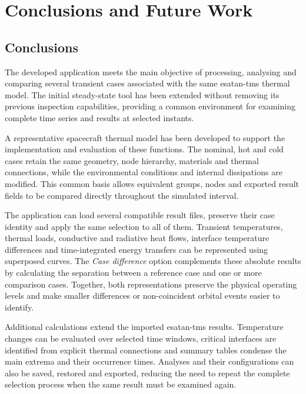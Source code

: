 \chapter{Conclusions and Future Work}
\label{ch:conclusions_future_work}

\section{Conclusions}
\label{sec:conclusions}

The developed application meets the main objective of processing, analysing
and comparing several transient cases associated with the same
\acrshort{esatan-tms} thermal model. The initial steady-state tool has been
extended without removing its previous inspection capabilities, providing a
common environment for examining complete time series and results at selected
instants.

A representative spacecraft thermal model has been developed to support the
implementation and evaluation of these functions. The nominal, hot and cold
cases retain the same geometry, node hierarchy, materials and thermal
connections, while the environmental conditions and internal dissipations are
modified. This common basis allows equivalent groups, nodes and exported
result fields to be compared directly throughout the simulated interval.

The application can load several compatible result files, preserve their case
identity and apply the same selection to all of them. Transient temperatures,
thermal loads, conductive and radiative heat flows, interface temperature
differences and time-integrated energy transfers can be represented using
superposed curves. The \textit{Case difference} option complements these
absolute results by calculating the separation between a reference case and
one or more comparison cases. Together, both representations preserve the
physical operating levels and make smaller differences or non-coincident
orbital events easier to identify.

Additional calculations extend the imported \acrshort{esatan-tms} results.
Temperature changes can be evaluated over selected time windows, critical
interfaces are identified from explicit thermal connections and summary tables
condense the main extrema and their occurrence times. Analyses and their
configurations can also be saved, restored and exported, reducing the need to
repeat the complete selection process when the same result must be examined
again.


